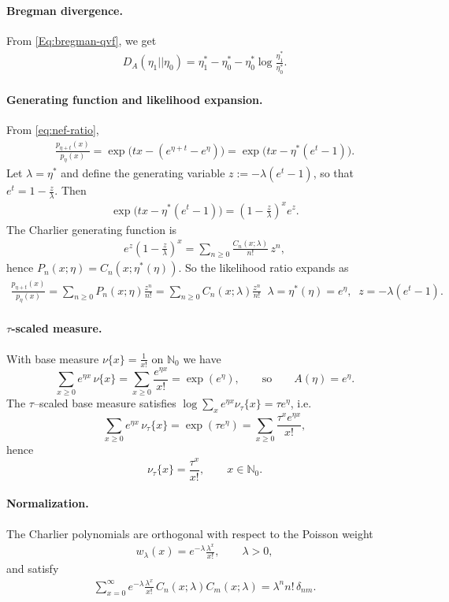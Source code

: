 \documentclass[a4paper,11pt]{article}
\numberwithin{equation}{section}
\theoremstyle{plain}
\theoremstyle{definition}
\theoremstyle{remark}
\newcommand{\1}{\ensuremath{\mathds{1}}\xspace}
\begin{document}
\paragraph{Bregman divergence.}
From \eqref{Eq:bregman-qvf}, we get 
\begin{align}
D_A(\eta_1||\eta_0)=\eta_1^\ast-\eta_0^\ast-\eta_0^\ast\log\frac{\eta_1^\ast}{\eta_0^\ast}.
\end{align}
\paragraph{Generating function and likelihood expansion.} 
From \eqref{eq:nef-ratio},
\begin{align}
\frac{p_{\eta+t}(x)}{p_\eta(x)}
=\exp\!\big(t x-(e^{\eta+t}-e^\eta)\big)
=\exp\!\big(t x-\eta^\ast(e^t-1)\big).
\end{align}
Let $\lambda=\eta^\ast$ and define the generating variable $z:=-\lambda(e^t-1)$, so that $e^t=1-\frac{z}{\lambda}$. Then
\begin{align}
\exp\!\big(t x-\eta^\ast(e^t-1)\big)
=(1-\tfrac{z}{\lambda})^x e^{z}.
\end{align}
The Charlier generating function is
\begin{align}
e^{z}(1-\tfrac{z}{\lambda})^x=\sum_{n\ge 0}\frac{C_n(x;\lambda)}{n!}\,z^n,
\end{align}
hence $P_n(x;\eta)=C_n(x;\eta^\ast(\eta))$.
So the likelihood ratio expands as
\begin{align}
\frac{p_{\eta+t}(x)}{p_\eta(x)}
=\sum_{n\ge 0}P_n(x;\eta)\frac{z^n}{n!}
=\sum_{n\ge 0}C_n(x;\lambda)\frac{z^n}{n!}
\;\; \lambda=\eta^\ast(\eta)=e^\eta,\;\; z=-\lambda(e^t-1).
\end{align}

\paragraph{$\tau$-scaled measure.}
With base measure $\nu\{x\}=\frac{1}{x!}$ on $\mathbb{N}_0$ we have
\[
\sum_{x\ge 0} e^{\eta x}\,\nu\{x\}=\sum_{x\ge 0}\frac{e^{\eta x}}{x!}=\exp(e^\eta),
\qquad\text{so}\qquad
A(\eta)=e^\eta.
\]
The $\tau$--scaled base measure satisfies $\log\sum_x e^{\eta x}\nu_\tau\{x\}=\tau e^\eta$, i.e.
\[
\sum_{x\ge 0} e^{\eta x}\,\nu_\tau\{x\}=\exp(\tau e^\eta)
=\sum_{x\ge 0}\frac{\tau^x e^{\eta x}}{x!},
\]
hence
\[
\nu_\tau\{x\}=\frac{\tau^x}{x!},\qquad x\in\mathbb{N}_0.
\]

\paragraph{Normalization.}
The Charlier polynomials are orthogonal with respect to the Poisson weight
\begin{align}
    w_\lambda(x)=e^{-\lambda}\frac{\lambda^x}{x!}, \qquad \lambda>0,
\end{align}
and satisfy
\begin{align}
    \sum_{x=0}^\infty e^{-\lambda}\frac{\lambda^x}{x!}\,
    C_n(x;\lambda)C_m(x;\lambda)
    = \lambda^n n!\,\delta_{nm}.
\end{align}
\end{document}
